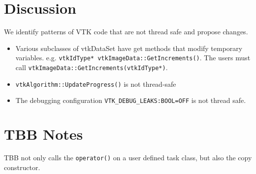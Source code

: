 \documentclass{article}
\begin{document}
\section{Discussion}

We identify patterns of VTK code that are not thread safe and propose changes.

\begin{itemize}
\item Various subclasses of vtkDataSet have get methods that modify temporary variables. e.g.
{\tt vtkIdType* vtkImageData::GetIncrements()}. The users must call {\tt vtkImageData::GetIncrements(vtkIdType*)}.
\item {\tt vtkAlgorithm::UpdateProgress()} is not thread-safe
\item The debugging configuration {\tt VTK\_DEBUG\_LEAKS:BOOL=OFF} is not thread safe.
\end{itemize}



\section{TBB Notes}

TBB not only calls the {\tt operator()} on a user defined task class,
but also the copy constructor.
\end{document}
